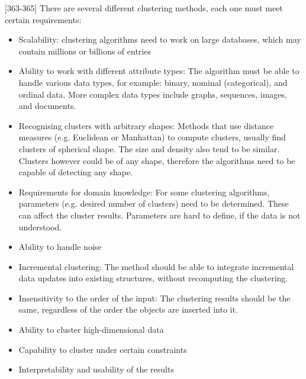 



\textcite{han2011data}[363-365]
There are several different clustering methods, each one must meet certain requirements:
\begin{itemize}
  \item Scalability: clustering algorithms need to work on large databases, which may contain millions or billions of entries
  \item Ability to work with different attribute types: The algorithm must be able to handle various data types, for example: binary, nominal (categorical), and ordinal data. More complex data types include graphs, sequences, images, and documents.
  \item Recognising clusters with arbitrary shapes: Methods that use distance measures (e.g. Euclidean or Manhattan) to compute clusters, usually find clusters of spherical shape. The size and density also tend to be similar. Clusters however could be of any shape, therefore the algorithms need to be capable of detecting any shape.
  \item Requirements for domain knowledge: For some clustering algorithms, parameters (e.g. desired number of clusters) need to be determined. These can affect the cluster results. Parameters are hard to define, if the data is not understood.
  \item Ability to handle noise
  \item Incremental clustering: The method should be able to integrate incremental data updates into existing structures, without recomputing the clustering.
  \item Insensitivity to the order of the input: The clustering results should be the same, regardless of the order the objects are inserted into it.
  \item Ability to cluster high-dimensional data %
  \item Capability to cluster under certain constraints %
  \item Interpretability and usability of the results
\end{itemize}

